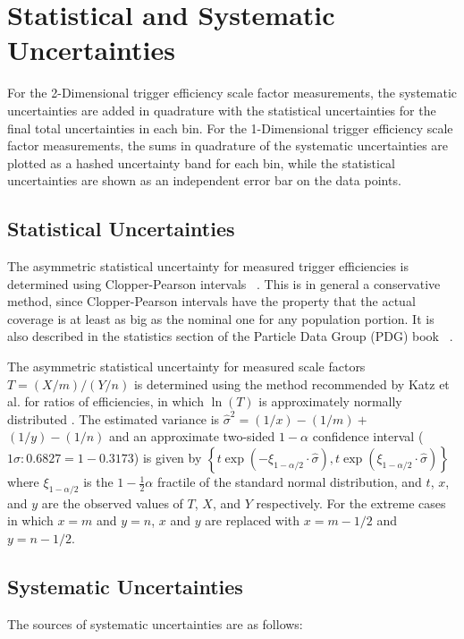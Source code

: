 \section{Statistical and Systematic Uncertainties}
For the 2-Dimensional trigger efficiency scale factor measurements, the systematic uncertainties are added in quadrature with the statistical uncertainties for the final total uncertainties in each bin. 
For the 1-Dimensional trigger efficiency scale factor measurements, the sums in quadrature of the systematic uncertainties are plotted as a hashed uncertainty band for each bin, while the statistical uncertainties are shown as an independent error bar on the data points.
\subsection{Statistical Uncertainties}
The asymmetric statistical uncertainty for measured trigger efficiencies is determined using Clopper-Pearson intervals ~\cite{bib:Cousins:2009kz}.
This is in general a conservative method, since Clopper-Pearson intervals have the property that the actual coverage is at least as big as the nominal one for any population portion. 
It is also described in the statistics section of the Particle Data Group (PDG) book ~\cite{bib:PDG}.

The asymmetric statistical uncertainty for measured scale factors $T=(X / m) /(Y / n)$ is determined using the method recommended by Katz et al. for ratios of efficiencies, in which $\ln (T)$ is approximately normally distributed \cite{bib:10.2307/2531405}. 
The estimated variance is  $\hat{\sigma}^{2}=(1 / x)-(1 / m)+$ $(1 / y)-(1 / n)$ and an approximate two-sided $1 - \alpha$ confidence interval ($1 \sigma: 0.6827 = 1 - 0.3173$) is given by $\left\{t \exp \left(-\xi_{1-\alpha / 2} \cdot \hat{\sigma}\right), t \exp \left(\xi_{1-\alpha / 2} \cdot \hat{\sigma}\right)\right\}$ where $\xi_{1-\alpha / 2}$ is the $1-\frac{1}{2} \alpha$ fractile of the standard normal distribution, and $t$, $x$, and $y$ are the observed values of $T$, $X$, and $Y$ respectively.  
For the extreme cases in which $x = m$ and $y = n$, $x$ and $y$ are replaced with $x = m - 1/2$ and $y = n - 1/2$.
\subsection{Systematic Uncertainties}
The sources of systematic uncertainties are as follows:
